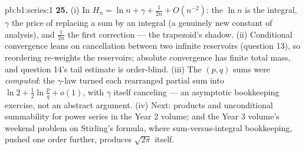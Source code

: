 \begin{solution}{pb:b1:series:1}
\textbf{25.} (i) In $H_n = \ln n + \gamma + \frac{1}{2n} +
O(n^{-2})$: the $\ln n$ is the integral, $\gamma$ the price of
replacing a sum by an integral (a genuinely new constant of
analysis), and $\frac{1}{2n}$ the first correction --- the
trapezoid's shadow. (ii) Conditional convergence leans on
cancellation between two infinite reservoirs (question 13), so
reordering re-weights the reservoirs; absolute convergence has
finite total mass, and question 14's tail estimate is
order-blind. (iii) The $(p,q)$ sums were \emph{computed}: the
$\gamma$-law turned each rearranged partial sum into $\ln 2 +
\frac12\ln\frac pq + o(1)$, with $\gamma$ itself canceling ---
an asymptotic bookkeeping exercise, not an abstract argument.
(iv) Next: products and unconditional summability for power
series in the Year 2 volume; and the Year 3 volume's weekend
problem on Stirling's formula, where sum-versus-integral
bookkeeping, pushed one order further, produces $\sqrt{2\pi}$
itself.
\end{solution}
